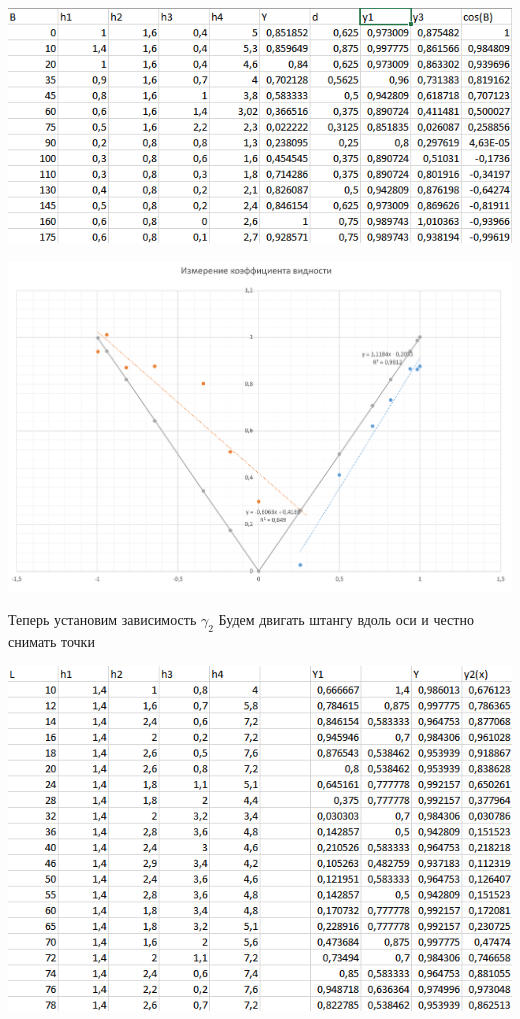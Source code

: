 \documentclass[12pt,a4paper]{article}
\begin{document}
\begin{center}
\includegraphics[scale=1]{452_tables.png}
\end{center}
\begin{center}
\includegraphics[scale=0.6]{452_graph1.png}
\end{center}


Теперь установим зависимость $\gamma_2$
Будем двигать штангу вдоль оси и честно снимать точки
\begin{center}
\includegraphics[scale=1]{452_tables2.png}
\end{center}
\end{document}
